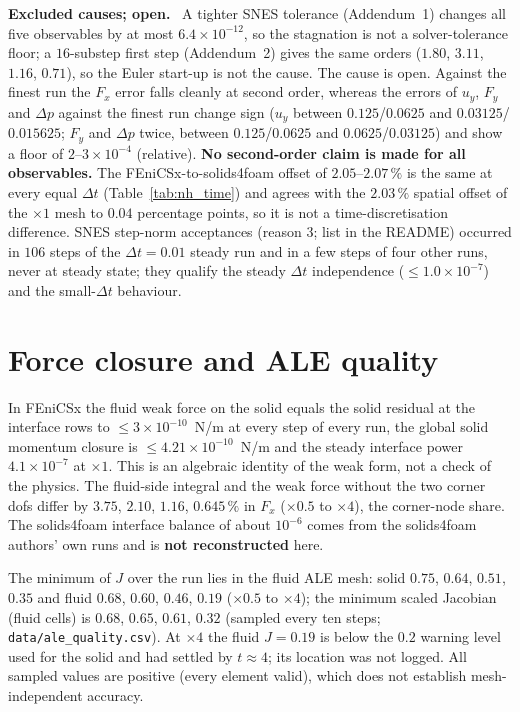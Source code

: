 \documentclass[sn-mathphys,Numbered]{sn-jnl}
\renewcommand{\paragraph}[1]{\par\vspace{0.3\baselineskip}\noindent\textbf{#1}\ }
\newcommand{\FE}{FEniCSx}
\begin{document}
\paragraph{Excluded causes; open.}
A tighter SNES tolerance (Addendum~1) changes all five observables by at most $6.4\times10^{-12}$, so the stagnation is not a solver-tolerance floor; a $16$-substep first step (Addendum~2) gives the same orders ($1.80$, $3.11$, $1.16$, $0.71$), so the Euler start-up is not the cause. The cause is open. Against the finest run the $F_x$ error falls cleanly at second order, whereas the errors of $u_y$, $F_y$ and $\Delta p$ against the finest run change sign ($u_y$ between $0.125$/$0.0625$ and $0.03125$/$0.015625$; $F_y$ and $\Delta p$ twice, between $0.125$/$0.0625$ and $0.0625$/$0.03125$) and show a floor of $2$--$3\times10^{-4}$ (relative). \textbf{No second-order claim is made for all observables.} The \FE{}-to-solids4foam offset of $2.05$--$2.07\,\%$ is the same at every equal $\Delta t$ (Table~\ref{tab:nh_time}) and agrees with the $2.03\,\%$ spatial offset of the $\times1$ mesh to $0.04$ percentage points, so it is not a time-discretisation difference. SNES step-norm acceptances (reason 3; list in the README) occurred in $106$ steps of the $\Delta t=0.01$ steady run and in a few steps of four other runs, never at steady state; they qualify the steady $\Delta t$ independence ($\le1.0\times10^{-7}$) and the small-$\Delta t$ behaviour.


\section{Force closure and ALE quality}\label{sec:nh_force}
In \FE{} the fluid weak force on the solid equals the solid residual at the interface rows to $\le3\times10^{-10}$~N/m at every step of every run, the global solid momentum closure is $\le4.21\times10^{-10}$~N/m and the steady interface power $4.1\times10^{-7}$ at $\times1$. This is an algebraic identity of the weak form, not a check of the physics. The fluid-side integral and the weak force without the two corner dofs differ by $3.75$, $2.10$, $1.16$, $0.645\,\%$ in $F_x$ ($\times0.5$ to $\times4$), the corner-node share. The solids4foam interface balance of about $10^{-6}$ comes from the solids4foam authors' own runs and is \textbf{not reconstructed} here.

The minimum of $J$ over the run lies in the fluid ALE mesh: solid $0.75$, $0.64$, $0.51$, $0.35$ and fluid $0.68$, $0.60$, $0.46$, $0.19$ ($\times0.5$ to $\times4$); the minimum scaled Jacobian (fluid cells) is $0.68$, $0.65$, $0.61$, $0.32$ (sampled every ten steps; \texttt{data/ale\_quality.csv}). At $\times4$ the fluid $J=0.19$ is below the $0.2$ warning level used for the solid and had settled by $t\approx4$; its location was not logged. All sampled values are positive (every element valid), which does not establish mesh-independent accuracy.
\end{document}
